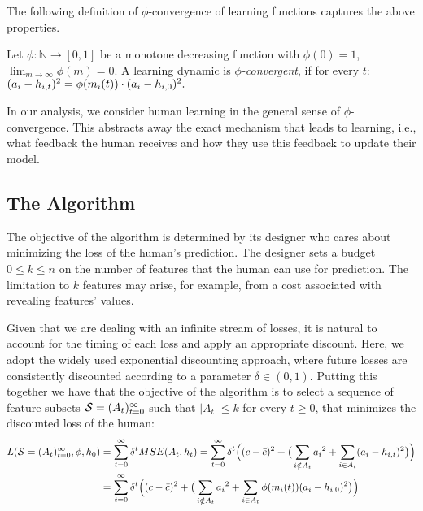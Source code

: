 The following definition of $\phi$-convergence of learning functions captures the above properties. 
\begin{definition} \label{def:convergence}
	Let $\phi: \mathbb{N} \to [0,1]$ be a monotone decreasing function with $\phi(0)=1$, $\lim_{m \rightarrow \infty} \phi(m) = 0$. 
    A learning dynamic is {\em $\phi$-convergent}, if for every $t$:
$	%
		(a_i-h_{i,t})^2 = \phi(\fs{i}{t})\cdot(a_i-h_{i,0})^2.
$	%
\end{definition}

In our analysis, we consider human learning in the general sense of $\phi$-convergence. This abstracts away the exact mechanism that leads to learning, i.e., what feedback the human receives and how they use this feedback to update their model. 


\subsection{The Algorithm}
The objective of the algorithm is determined by its designer who cares about minimizing the loss of the human's prediction. 
The designer sets a budget \( 0 \leq k \leq n \) on the number of features that the human can use for prediction. The limitation to \( k \) features may arise, for example, from a cost associated with revealing features' values.

Given that we are dealing with an infinite stream of losses, it is natural to account for the timing of each loss and apply an appropriate discount. Here, 
we adopt the widely used exponential discounting approach, where future losses are consistently discounted according to a parameter \( \delta \in (0,1) \). 
%
Putting this together we have that the objective of the algorithm is to select a sequence of feature subsets $\mathcal{S}=(A_t)_{t=0}^\infty$ such that $|A_t|\leq k$ for every $t\geq 0$, that minimizes the discounted loss of the human:
\begin{align} \label{alg:objective-function}
 L(\mathcal{S}=(A_t)_{t=0}^\infty,\phi,h_0) &= \sum_{t=0}^\infty \delta^t  MSE(A_t,h_t) =  
 \sum_{t=0}^\infty \delta^t \Big( (c-\bar c)^2 + \big(\sum_{i \notin A_t} {a_i}^2 + \sum_{i \in A_t} (a_i - h_{i,t})^2 \big) \Big) 
 \notag \\
  &= \sum_{t=0}^\infty \delta^t \Big((c-\bar c)^2 + \big(\sum_{i \notin A_t} {a_i}^2 + \sum_{i \in A_t} \phi(m_{i}(t))(a_i - h_{i,0})^2 \big)\Big)
\end{align}

